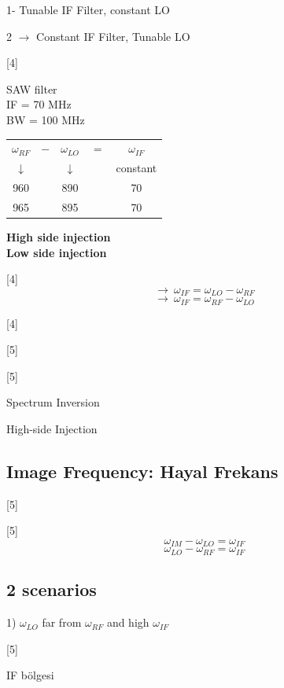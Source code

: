 \documentclass[11pt,a4paper]{article}
\begin{document}
1- Tunable IF Filter, constant LO

2 $\to$ Constant IF Filter, Tunable LO

[4]

SAW filter\\
IF = 70 MHz\\
BW = 100 MHz

\begin{center}
\begin{tabular}{@{}c@{\ }c@{\ }c@{\ }c@{\ }c@{}}
$\omega_{RF}$ & $-$ & $\omega_{LO}$ & $=$ & $\omega_{IF}$\\
$\downarrow$ & & $\downarrow$ & & constant\\
960 & & 890 & & 70\\
965 & & 895 & & 70
\end{tabular}
\end{center}

\textbf{High side injection}\\
\textbf{Low side injection}

[4]
\[ \to\ \omega_{IF}=\omega_{LO}-\omega_{RF} \]
\[ \to\ \omega_{IF}=\omega_{RF}-\omega_{LO} \]

[4]

[5]

[5]

Spectrum Inversion

High-side Injection

\subsection{Image Frequency: Hayal Frekans}

[5]

[5]
\[ \omega_{IM}-\omega_{LO}=\omega_{IF} \]
\[ \omega_{LO}-\omega_{RF}=\omega_{IF} \]

\subsection{2 scenarios}

1) $\omega_{LO}$ far from $\omega_{RF}$ and high $\omega_{IF}$

[5]

IF bölgesi
\end{document}
